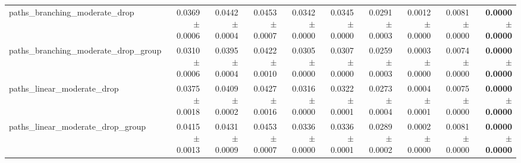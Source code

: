 \begin{tabular}{@{}lrrrrrrrrr@{}}
paths\_branching\_moderate\_drop & 0.0369 $\pm$ 0.0006 & 0.0442 $\pm$ 0.0004 & 0.0453 $\pm$ 0.0007 & 0.0342 $\pm$ 0.0000 & 0.0345 $\pm$ 0.0000 & 0.0291 $\pm$ 0.0003 & 0.0012 $\pm$ 0.0000 & 0.0081 $\pm$ 0.0000 & \textbf{0.0000 $\pm$ 0.0000} \\
paths\_branching\_moderate\_drop\_group & 0.0310 $\pm$ 0.0006 & 0.0395 $\pm$ 0.0004 & 0.0422 $\pm$ 0.0010 & 0.0305 $\pm$ 0.0000 & 0.0307 $\pm$ 0.0000 & 0.0259 $\pm$ 0.0003 & 0.0003 $\pm$ 0.0000 & 0.0074 $\pm$ 0.0000 & \textbf{0.0000 $\pm$ 0.0000} \\
paths\_linear\_moderate\_drop & 0.0375 $\pm$ 0.0018 & 0.0409 $\pm$ 0.0002 & 0.0427 $\pm$ 0.0016 & 0.0316 $\pm$ 0.0000 & 0.0322 $\pm$ 0.0001 & 0.0273 $\pm$ 0.0004 & 0.0004 $\pm$ 0.0001 & 0.0075 $\pm$ 0.0000 & \textbf{0.0000 $\pm$ 0.0000} \\
paths\_linear\_moderate\_drop\_group & 0.0415 $\pm$ 0.0013 & 0.0431 $\pm$ 0.0009 & 0.0453 $\pm$ 0.0007 & 0.0336 $\pm$ 0.0000 & 0.0336 $\pm$ 0.0001 & 0.0289 $\pm$ 0.0002 & 0.0002 $\pm$ 0.0000 & 0.0081 $\pm$ 0.0000 & \textbf{0.0000 $\pm$ 0.0000} \\
\bottomrule
\end{tabular}
